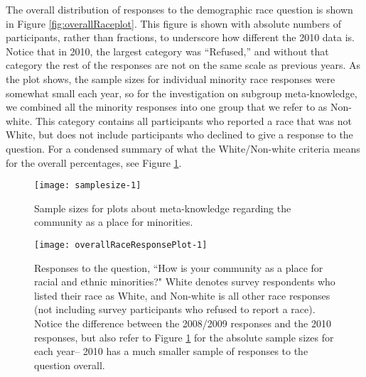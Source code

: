 \documentclass[smallextended]{svjour3}\usepackage[]{graphicx}\usepackage[]{color}
\newenvironment{knitrout}{}{} %
\begin{document}
The overall distribution of responses to the demographic race question is shown in Figure \ref{fig:overallRaceplot}. This figure is shown with absolute numbers of participants, rather than fractions, to underscore how different the 2010 data is. Notice that in 2010, the largest category was ``Refused,'' and without that category the rest of the responses are not on the same scale as previous years. As the plot shows, the sample sizes for individual minority race responses were somewhat small each year, so for the investigation on subgroup meta-knowledge, we combined all the minority responses into one group that we refer to as Non-white. This category contains all participants who reported a race that was not White, but does not include participants who declined to give a response to the question. For a condensed summary of what the White/Non-white criteria means for the overall percentages, see Figure \ref{fig:samplesize}. 



\begin{knitrout}
\color{fgcolor}\begin{figure}

{\centering \texttt{[image: samplesize-1]} 

}

\caption[Sample sizes for plots about meta-knowledge regarding the community as a place for minorities]{Sample sizes for plots about meta-knowledge regarding the community as a place for minorities.}\label{fig:samplesize}
\end{figure}


\end{knitrout}

\begin{knitrout}
\color{fgcolor}\begin{figure}

{\centering \texttt{[image: overallRaceResponsePlot-1]} 

}

\caption{Responses to the question, ``How is your community as a place for racial and ethnic minorities?" White denotes survey respondents who listed their race as White, and Non-white is all other race responses (not including survey participants who refused to report a race). Notice the difference between the 2008/2009 responses and the 2010 responses, but also refer to Figure \ref{fig:samplesize} for the absolute sample sizes for each year-- 2010 has a much smaller sample of responses to the question overall.}\label{fig:overallRaceResponsePlot}
\end{figure}


\end{knitrout}
\end{document}
